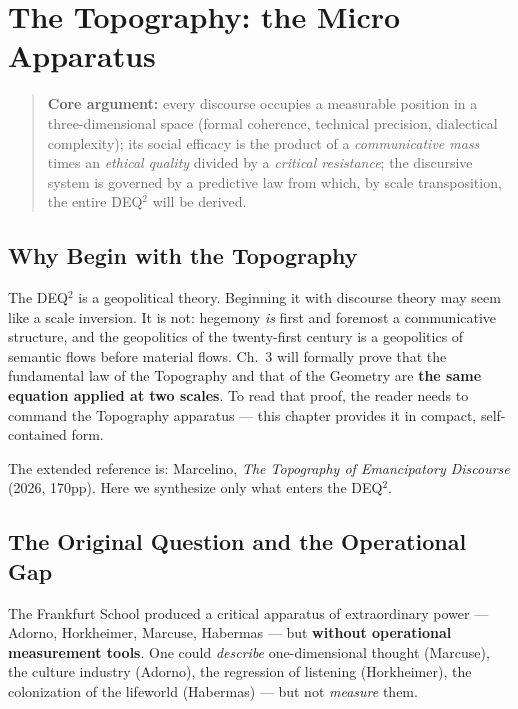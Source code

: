 \chapter{The Topography: the Micro
Apparatus}\label{the-topography-micro-apparatus}

\begin{quote}
\textbf{Core argument:} every discourse occupies a measurable position
in a three-dimensional space (formal coherence, technical precision,
dialectical complexity); its social efficacy is the product of a
\emph{communicative mass} times an \emph{ethical quality} divided by a
\emph{critical resistance}; the discursive system is governed by a
predictive law from which, by scale transposition, the entire DEQ$^2$
will be derived.
\end{quote}

\section{Why Begin with the
Topography}\label{why-begin-with-topography}

The DEQ$^2$ is a geopolitical theory. Beginning it with discourse theory
may seem like a scale inversion. It is not: hegemony \emph{is} first and
foremost a communicative structure, and the geopolitics of the twenty-first
century is a geopolitics of semantic flows before material flows. Ch.~3
will formally prove that the fundamental law of the Topography and that
of the Geometry are \textbf{the same equation applied at two scales}. To
read that proof, the reader needs to command the Topography apparatus ---
this chapter provides it in compact, self-contained form.

The extended reference is: Marcelino, \emph{The Topography of
Emancipatory Discourse} (2026, 170pp). Here we synthesize only what
enters the DEQ$^2$.

\section{The Original Question and the Operational
Gap}\label{original-question-operational-gap}

The Frankfurt School produced a critical apparatus of extraordinary power
--- Adorno, Horkheimer, Marcuse, Habermas --- but
\textbf{without operational measurement tools}. One could
\emph{describe} one-dimensional thought (Marcuse), the culture industry
(Adorno), the regression of listening (Horkheimer), the colonization of
the lifeworld (Habermas) --- but not \emph{measure} them.

